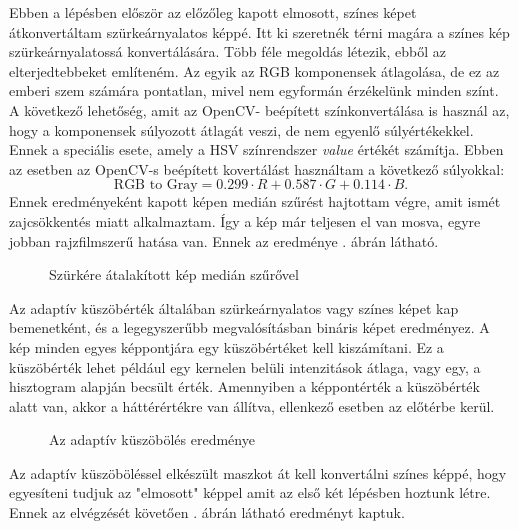 Ebben a lépésben először az előzőleg kapott elmosott, színes képet átkonvertáltam szürkeárnyalatos képpé. 
Itt ki szeretnék térni magára a színes kép szürkeárnyalatossá konvertálására. Több féle megoldás létezik, ebből az elterjedtebbeket említeném. Az egyik az RGB komponensek átlagolása, de ez az emberi szem számára pontatlan, mivel nem egyformán érzékelünk minden színt. A következő lehetőség, amit az OpenCV- beépített színkonvertálása is használ az, hogy a komponensek súlyozott átlagát veszi, de nem egyenlő súlyértékekkel. Ennek a speciális esete, amely a HSV színrendszer \textit{value} értékét számítja. Ebben az esetben az OpenCV-s beépített kovertálást használtam a következő súlyokkal:
$$
\text{RGB to Gray} = 0.299 \cdot R+0.587 \cdot G + 0.114 \cdot B.
$$ 
Ennek eredményeként kapott képen medián szűrést hajtottam végre, amit ismét zajcsökkentés miatt alkalmaztam. Így a kép már teljesen el van mosva, egyre jobban rajzfilmszerű hatása van. Ennek az eredménye . ábrán látható.

\begin{figure}[h!]
\centering
{}
\caption{Szürkére átalakított kép medián szűrővel} 
\label{fig:cartoon3}
\end{figure}

\newpage


Az adaptív küszöbérték általában szürkeárnyalatos vagy színes képet kap bemenetként, és a legegyszerűbb megvalósításban bináris képet eredményez. A kép minden egyes képpontjára egy küszöbértéket kell kiszámítani. Ez a küszöbérték lehet például egy kernelen belüli intenzitások átlaga, vagy egy, a hisztogram alapján becsült érték. Amennyiben a képpontérték a küszöbérték alatt van, akkor a háttérértékre van állítva, ellenkező esetben az előtérbe kerül.

\begin{figure}[h!]
\centering
{}
\caption{Az adaptív küszöbölés eredménye} 
\label{fig:cartoon4}
\end{figure}


Az adaptív küszöböléssel elkészült maszkot át kell konvertálni színes képpé, hogy egyesíteni tudjuk az "elmosott" képpel amit az első két lépésben hoztunk létre. Ennek az elvégzését követően . ábrán látható eredményt kaptuk.


